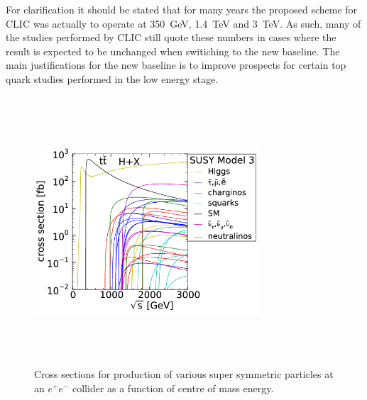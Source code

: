 For clarification it should be stated that for many years the proposed scheme for CLIC was actually to operate at 350~GeV, 1.4~TeV and 3~TeV. As such, many of the studies performed by CLIC still quote these numbers in cases where the result is expected to be unchanged when switiching to the new baseline. The main justifications for the new baseline is to improve prospects for certain top quark studies performed in the low energy stage.

\begin{figure}
  \centering
  \includegraphics[width=0.75\textwidth,height=10cm,keepaspectratio]{Experiments/fig/clicSS}
  \caption[Cross Sections For Super Symmetric Processes]{Cross sections for production of various super symmetric particles at an ${e^+e^-}$ collider as a function of centre of mass energy.}
  \label{Fig:SuperSym}
\end{figure}

